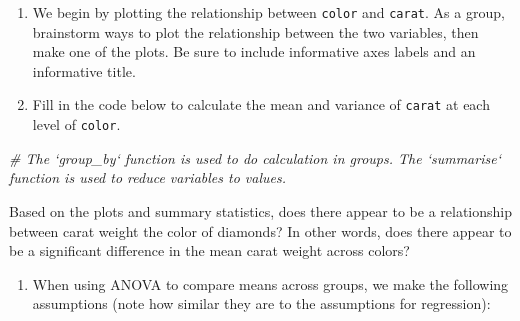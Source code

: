 \documentclass[]{book}
\newenvironment{Shaded}{\begin{snugshade}}{\end{snugshade}}
\newcommand{\KeywordTok}[1]{\textcolor[rgb]{0.13,0.29,0.53}{\textbf{#1}}}
\newcommand{\DataTypeTok}[1]{\textcolor[rgb]{0.13,0.29,0.53}{#1}}
\newcommand{\StringTok}[1]{\textcolor[rgb]{0.31,0.60,0.02}{#1}}
\newcommand{\CommentTok}[1]{\textcolor[rgb]{0.56,0.35,0.01}{\textit{#1}}}
\newcommand{\OperatorTok}[1]{\textcolor[rgb]{0.81,0.36,0.00}{\textbf{#1}}}
\newcommand{\NormalTok}[1]{#1}
\providecommand{\tightlist}{%
  \setlength{\itemsep}{0pt}\setlength{\parskip}{0pt}}
\begin{document}
\begin{enumerate}
\def\labelenumi{\arabic{enumi}.}
\setcounter{enumi}{1}
\item
  We begin by plotting the relationship between \texttt{color} and
  \texttt{carat}. As a group, brainstorm ways to plot the relationship
  between the two variables, then make one of the plots. Be sure to
  include informative axes labels and an informative title.
\item
  Fill in the code below to calculate the mean and variance of
  \texttt{carat} at each level of \texttt{color}.
\end{enumerate}

\begin{Shaded}
\begin{Highlighting}[]
\CommentTok{# The `group_by` function is used to do calculation in groups. The `summarise` function is used to reduce variables to values.}
\end{Highlighting}
\end{Shaded}

\begin{Shaded}
\end{Shaded}

Based on the plots and summary statistics, does there appear to be a
relationship between carat weight the color of diamonds? In other words,
does there appear to be a significant difference in the mean carat
weight across colors?

\begin{enumerate}
\def\labelenumi{\arabic{enumi}.}
\setcounter{enumi}{3}
\tightlist
\item
  When using ANOVA to compare means across groups, we make the following
  assumptions (note how similar they are to the assumptions for
  regression):
\end{enumerate}
\end{document}
